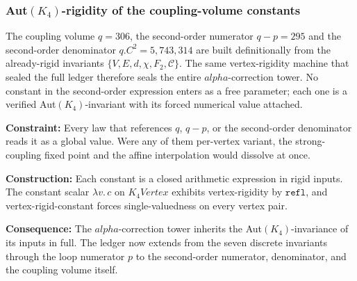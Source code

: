 \documentclass[11pt,a4paper]{book}
\def\alpha{alpha}%
\def\cdot{.}%
\def\mathrm#1{#1}%
\def\texttt#1{#1}%
\begin{document}
\subsubsection*{Aut$(K_4)$-rigidity of the coupling-volume constants}

The coupling volume $q = 306$, the second-order numerator $q - p = 295$ and
the second-order denominator $q \cdot C^{2} = 5{,}743{,}314$ are built
definitionally from the already-rigid invariants $\{V, E, d, \chi, F_2,
\mathcal{C}\}$. The same vertex-rigidity machine that sealed the full ledger
therefore seals the entire $\alpha$-correction tower. No constant in the
second-order expression enters as a free parameter; each one is a verified
Aut$(K_4)$-invariant with its forced numerical value attached.

\textbf{Constraint:} Every law that references $q$, $q - p$, or the
second-order denominator reads it as a global value. Were any of them
per-vertex variant, the strong-coupling fixed point and the affine
interpolation would dissolve at once.

\textbf{Construction:} Each constant is a closed arithmetic expression in
rigid inputs. The constant scalar $\lambda v.\,c$ on $K_4\mathrm{Vertex}$
exhibits vertex-rigidity by $\mathtt{refl}$, and
\texttt{vertex-rigid-constant} forces single-valuedness on every vertex pair.

\textbf{Consequence:} The $\alpha$-correction tower inherits the
Aut$(K_4)$-invariance of its inputs in full. The ledger now extends from the
seven discrete invariants through the loop numerator $p$ to the second-order
numerator, denominator, and the coupling volume itself.
\end{document}
